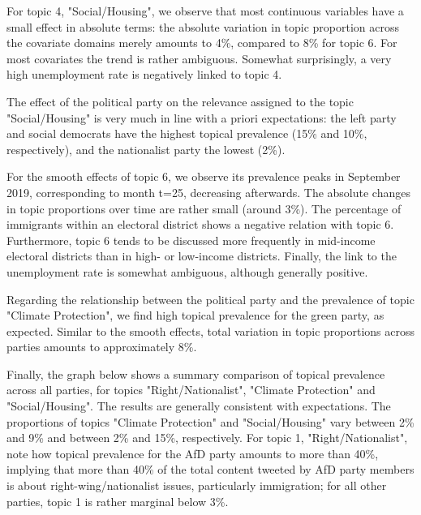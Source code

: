 For topic 4, "Social/Housing", we observe that most continuous variables have a small effect in absolute terms: the absolute variation in topic proportion across the covariate domains merely amounts to 4\%, compared to 8\% for topic 6. For most covariates the trend is rather ambiguous. Somewhat surprisingly, a very high unemployment rate is negatively linked to topic 4.

The effect of the political party on the relevance assigned to the topic "Social/Housing" is very much in line with a priori expectations: the left party and social democrats have the highest topical prevalence (15\% and 10\%, respectively), and the nationalist party the lowest (2\%).

For the smooth effects of topic 6, we observe its prevalence peaks in September 2019, corresponding to month t=25, decreasing afterwards. The absolute changes in topic proportions over time are rather small (around 3\%). The percentage of immigrants within an electoral district shows a negative relation with topic 6. Furthermore, topic 6 tends to be discussed more frequently in mid-income electoral districts than in high- or low-income districts. Finally, the link to the unemployment rate is somewhat ambiguous, although generally positive.

Regarding the relationship between the political party and the prevalence of topic "Climate Protection", we find high topical prevalence for the green party, as expected. Similar to the smooth effects, total variation in topic proportions across parties amounts to approximately 8\%.

Finally, the graph below shows a summary comparison of topical prevalence across all parties, for topics "Right/Nationalist", "Climate Protection" and "Social/Housing". The results are generally consistent with expectations. The proportions of topics "Climate Protection" and "Social/Housing" vary between 2\% and 9\% and between 2\% and 15\%, respectively. For topic 1, "Right/Nationalist", note how topical prevalence for the AfD party amounts to more than 40\%, implying that more than 40\% of the total content tweeted by AfD party members is about right-wing/nationalist issues, particularly immigration; for all other parties, topic 1 is rather marginal below 3\%.


